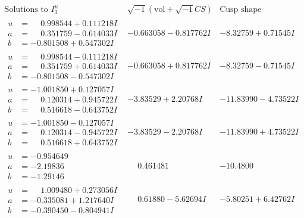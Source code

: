 \documentclass[1p]{elsarticle_modified}
\theoremstyle{definition}
\newcommand{\I}{\sqrt{-1}}
\begin{document}
$$\begin{array}{c|c|c}  
\text{Solutions to }I^u_{1}& \I (\text{vol} + \sqrt{-1}CS) & \text{Cusp shape}\\
 \hline 
\begin{aligned}
u &= \phantom{-}0.998544 + 0.111218 I \\
a &= \phantom{-}0.351759 - 0.614033 I \\
b &= -0.801508 + 0.547302 I\end{aligned}
 & -0.663058 - 0.817762 I & -8.32759 + 0.71545 I \\ \hline\begin{aligned}
u &= \phantom{-}0.998544 - 0.111218 I \\
a &= \phantom{-}0.351759 + 0.614033 I \\
b &= -0.801508 - 0.547302 I\end{aligned}
 & -0.663058 + 0.817762 I & -8.32759 - 0.71545 I \\ \hline\begin{aligned}
u &= -1.001850 + 0.127057 I \\
a &= \phantom{-}0.120314 + 0.945722 I \\
b &= \phantom{-}0.516618 - 0.643752 I\end{aligned}
 & -3.83529 + 2.20768 I & -11.83990 - 4.73522 I \\ \hline\begin{aligned}
u &= -1.001850 - 0.127057 I \\
a &= \phantom{-}0.120314 - 0.945722 I \\
b &= \phantom{-}0.516618 + 0.643752 I\end{aligned}
 & -3.83529 - 2.20768 I & -11.83990 + 4.73522 I \\ \hline\begin{aligned}
u &= -0.954649\phantom{ +0.000000I} \\
a &= -2.19836\phantom{ +0.000000I} \\
b &= -1.29146\phantom{ +0.000000I}\end{aligned}
 & \phantom{-}0.461481\phantom{ +0.000000I} & -10.4800\phantom{ +0.000000I} \\ \hline\begin{aligned}
u &= \phantom{-}1.009480 + 0.273056 I \\
a &= -0.335081 + 1.217640 I \\
b &= -0.390450 - 0.804941 I\end{aligned}
 & \phantom{-}0.61880 - 5.62694 I & -5.80251 + 6.42762 I \\ \hline\begin{aligned}

\end{aligned}
\end{array}$$
\end{document}
